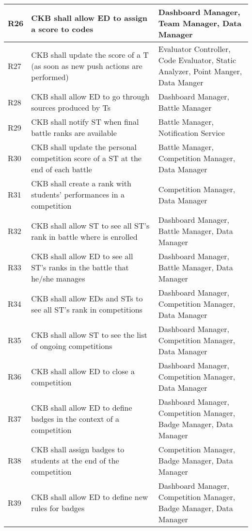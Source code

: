 \begin{center}
\begin{longtable}{|p{0.05\linewidth}|p{0.55\linewidth}|p{0.4\linewidth}|}
        \hline
        R26 & CKB shall allow ED to assign a score to codes & Dashboard Manager, Team Manager, Data Manager \\
        \hline
        R27 & CKB shall update the score of a T (as soon as new push actions are performed) & Evaluator Controller, Code Evaluator, Static Analyzer, Point Manger, Data Manger\\
        \hline
        R28 & CKB shall allow ED to go through sources produced by Ts & Dashboard Manager, Battle Manager\\
        \hline
        R29 & CKB shall notify ST when final battle ranks are available & Battle Manager, Notification Service \\
        \hline
        R30 & CKB shall update the personal competition score of a ST at the end of each battle & Battle Manager, Competition Manager, Data Manager\\
        \hline
        R31 & CKB shall create a rank with students' performances in a competition & Competition Manager, Data Manager \\
        \hline
        R32 & CKB shall allow ST to see all ST’s rank in battle where is enrolled & Dashboard Manager, Battle Manager,  Data Manager \\
        \hline
        R33 & CKB shall allow ED to see all ST’s ranks in the battle that he/she manages & Dashboard Manager, Battle Manager, Data Manager\\
        \hline
        R34 & CKB shall allow EDs and STs to see all ST’s rank in competitions & Dashboard Manager, Competition Manager, Data Manager \\
        \hline
        R35 & CKB shall allow ST to see the list of ongoing competitions & Dashboard Manager, Competition Manager, Data Manager\\
        \hline
        R36 & CKB shall allow ED to close a competition &  Dashboard Manager, Competition Manager, Data Manager\\
        \hline
        R37 & CKB shall allow ED to define badges in the context of a competition & Dashboard Manager, Competition Manager, Badge Manager, Data Manager \\
        \hline
        R38 & CKB shall assign badges to students at the end of the competition & Competition Manager, Badge Manager, Data Manager \\
        \hline
        R39 & CKB shall allow ED to define new rules for badges & Dashboard Manager, Competition Manager, Badge Manager, Data Manager \\

\end{longtable}
\end{center}
